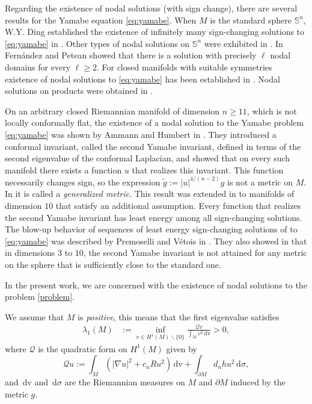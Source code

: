 \documentclass[reqno,11pt,oneside]{amsart}
\numberwithin{equation}{section}
\def\im{\int_{M}}
\def\idm{\int_{\partial M}}
\def\tilde{\widetilde}
\def\d{\,\mathrm{d}}
\def\dv{\,\mathrm{dv}}
\begin{document}
Regarding the existence of nodal solutions (with sign change), there are several results for the Yamabe equation \eqref{eq:yamabe}. When $M$ is the standard sphere $\mathbb{S}^n$, W.Y. Ding established the existence of infinitely many sign-changing solutions to \eqref{eq:yamabe} in \cite{ding}. Other types of nodal solutions on $\mathbb{S}^n$ were exhibited in \cite{dmpp1,dmpp2,c,cfs,mm}.  In \cite{fp} Fernández and Petean showed that there is a solution with precisely $\ell$ nodal domains for every $\ell\geq 2$. For closed manifolds with suitable symmetries existence of nodal solutions to \eqref{eq:yamabe} has been established in \cite{cf,cp}. Nodal solutions on products were obtained in \cite{h,p}.

On an arbitrary closed Riemannian manifold of dimension $n\geq 11$, which is not locally conformally flat, the existence of a nodal solution to the Yamabe problem \eqref{eq:yamabe} was shown by Ammann and Humbert in \cite{ah}. They introduced a conformal invariant, called  the second Yamabe invariant, defined in terms of the second eigenvalue of the conformal Laplacian, and showed that on every such manifold there exists a function $u$ that realizes this invariant. This function necessarily changes sign, so the expression $\tilde{g}:=|u|^{4/(n-2)}g$ is not a metric on $M$. In \cite{ah} it is called a \emph{generalized metric}. This result was extended in \cite[Theorem 1.2$(v)$]{cpt} to manifolds of dimension $10$ that satisfy an additional assumption. Every function that realizes the second Yamabe invariant has least energy among all sign-changing solutions. The blow-up behavior of sequences of least energy sign-changing solutions of to \eqref{eq:yamabe} was described by Premoselli and Vétois in \cite{pv}. They also showed in \cite{pv2} that in dimensions $3$ to $10$, the second Yamabe invariant is not attained for any metric on the sphere that is sufficiently close to the standard one. 

In the present work, we are concerned with the existence of nodal solutions to the problem \eqref{problem}.

We assume that $M$ is \emph{positive}, this means that the first eigenvalue satisfies
\begin{align} \label{eq:M positive}
\lambda_1(M)&:=\inf_{v\in H^1(M)\smallsetminus\{0\}}\frac{\mathscr{Q}v}{\im v^2\dv}>0,
\end{align}
where $\mathscr{Q}$ is the quadratic form on $H^1(M)$ given by
\begin{equation}\label{eq:quadratic form}
\mathscr{Q}u:=\im(|\nabla u|^2+c_nRu^2)\dv+\idm d_nhu^2\d \sigma,
\end{equation}
and $\dv$ and $\d \sigma$ are the Riemannian measures on $M$ and $\partial M$ induced by the metric $g$. 
\end{document}
